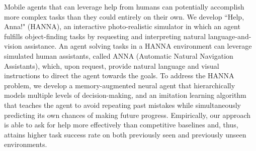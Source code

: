 Mobile agents that can leverage help from humans can potentially accomplish more complex tasks than they could entirely on their own. We develop ``Help, Anna!" (HANNA), an interactive photo-realistic simulator in which an agent fulfills object-finding tasks by requesting and interpreting natural language-and-vision assistance. An agent solving tasks in a HANNA environment can leverage simulated human assistants, called ANNA (Automatic Natural Navigation Assistants), which, upon request, provide natural language and visual instructions to direct the agent towards the goals. To address the HANNA problem, we develop a memory-augmented neural agent that hierarchically models multiple levels of decision-making, and an imitation learning algorithm that teaches the agent to avoid repeating past mistakes while simultaneously predicting its own chances of making future progress. Empirically, our approach is able to ask for help more effectively than competitive baselines and, thus, attains higher task success rate on both previously seen and previously unseen environments.